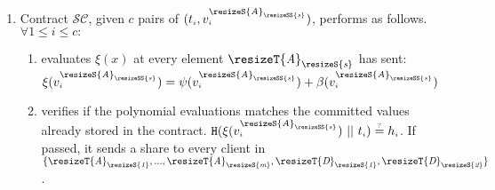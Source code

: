 \begin{enumerate}
\begin{enumerate}
\item Contract $\mathcal{SC}$, given $c$ pairs of $(t_{\scriptscriptstyle i},v^{\resizeS {\textit  A}_{\resizeSS {\textit  s}}}_{\scriptscriptstyle i})$,  performs as follows. $\forall 1\leq i\leq c:$ 
\begin{enumerate}
 \item evaluates  $\xi(x)$ at every element  $\resizeT {\textit A}_{\resizeS {\textit  s}}$ has sent: $\xi(v^{\resizeS {\textit  A}_{\resizeSS {\textit  s}}}_{\scriptscriptstyle i})=\psi(v^{\resizeS {\textit  A}_{\resizeSS {\textit  s}}}_{\scriptscriptstyle i})+\beta(v^{\resizeS {\textit  A}_{\resizeSS {\textit  s}}}_{\scriptscriptstyle i})$
 \item verifies if the polynomial evaluations matches the committed values already stored in the contract. $ \mathtt{H}(\xi(v^{\resizeS {\textit  A}_{\resizeSS {\textit  s}}}_{\scriptscriptstyle i}) \ || \ t_{\scriptscriptstyle i})\stackrel{\scriptscriptstyle ?}=h_{\scriptscriptstyle i}$.  If passed, it sends a share to every client in  $\{\resizeT {\textit A}_{\resizeS {\textit  1}},..., \resizeT {\textit A}_{\resizeS {\textit  m}},\resizeT {\textit  D}_{\resizeS {\textit  1}},\resizeT {\textit  D}_{\resizeS {\textit  2}}\}$. 
 
\end{enumerate}


\end{enumerate}
\end{enumerate}









